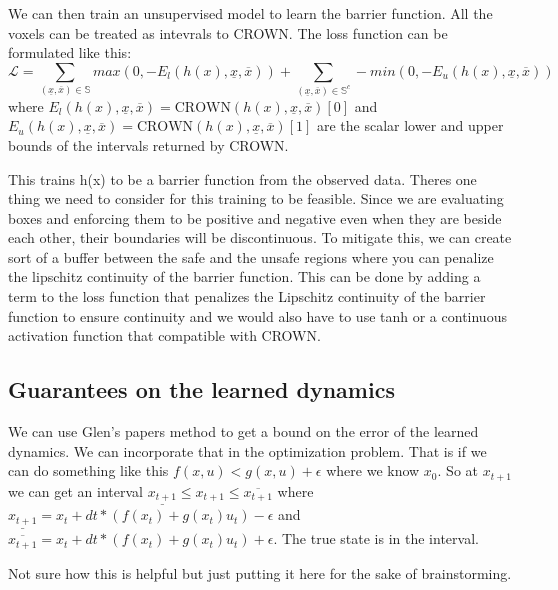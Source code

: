 \documentclass[12pt]{article}
\begin{document}
We can then train an unsupervised model to learn the barrier function. All the voxels can be treated as intevrals to CROWN. The loss function can be formulated like this:
\[\mathcal{L} = \sum_{(\underline{x},\overline{x}) \in \mathbb{S}} max(0, -E_{l}(h(x), \underline{x}, \overline{x})) + \sum_{(\underline{x},\overline{x}) \in \mathbb{S}^c} -min(0, -E_{u}(h(x), \underline{x}, \overline{x}))\]
where \(E_{l}(h(x), \underline{x}, \overline{x}) = \text{CROWN}(h(x), \underline{x}, \overline{x})[0]\) and \(E_{u}(h(x), \underline{x}, \overline{x}) = \text{CROWN}(h(x), \underline{x}, \overline{x})[1]\) are the scalar lower and upper bounds of the intervals returned by CROWN.

This trains h(x) to be a barrier function from the observed data. Theres one thing we need to consider for this training to be feasible. Since we are evaluating boxes and enforcing them to be positive and negative even when they are beside each other, their boundaries will be discontinuous. 
To mitigate this, we can create sort of a buffer between the safe and the unsafe regions where you can penalize the lipschitz continuity of the barrier function. This can be done by adding a term to the loss function that penalizes the Lipschitz continuity of the barrier function to ensure continuity and we would also have to use tanh or 
a continuous activation function that compatible with CROWN. 

\subsection{Guarantees on the learned dynamics}
We can use Glen's papers method to get a bound on the error of the learned dynamics. We can incorporate that in the optimization problem. That is if we can do something like this \(f(x,u) < g(x,u) + \epsilon\) where we know \(x_{0}\).
So at \(x_{t+1}\) we can get an interval \(\underline{x_{t+1}} \leq x_{t+1} \leq \overline{x_{t+1}}\) where \(\underline{x_{t+1}} = x_{t} + dt * (f(x_{t}) + g(x_{t})u_{t}) - \epsilon\) and \(\overline{x_{t+1}} = x_{t} + dt * (f(x_{t}) + g(x_{t})u_{t}) + \epsilon\). The true state is in the interval.

Not sure how this is helpful but just putting it here for the sake of brainstorming. 

\end{document}
